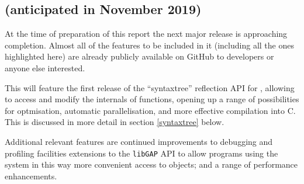 \documentclass{deliverablereport}
\begin{document}
\subsection{ (anticipated in November 2019)}\label{gap-4.11}



At the time of preparation of this report the next major release  is approaching completion. Almost all of the features to be
included in it (including all the ones highlighted here) are already
publicly  available on GitHub to developers or anyone else interested.

This will feature the first release of the ``syntaxtree'' reflection
API for \GAP, allowing \GAP to access and modify the internals of \GAP
functions, opening up a range of possibilities for optmisation, automatic
parallelisation, and more effective compilation into C. This is
discussed in more detail in section \ref{syntaxtree} below. 

Additional relevant features are continued improvements to debugging and
profiling facilities  extensions to the
\texttt{libGAP} API to allow programs using the system in this way
more convenient access to \GAP objects; and a range of performance
enhancements.


%
%
%

\end{document}
